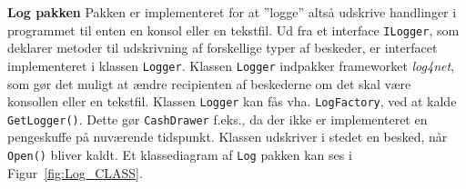 \textbf{Log pakken}
\newline
Pakken er implementeret for at ''logge'' altså udskrive handlinger i programmet til enten en konsol eller en tekstfil.
Ud fra et interface \texttt{ILogger}, som deklarer metoder til udskrivning af forskellige typer af beskeder, er interfacet implementeret i klassen \texttt{Logger}.
Klassen \texttt{Logger} indpakker frameworket \textit{log4net}, som gør det muligt at ændre recipienten af beskederne om det skal være konsollen eller en tekstfil. Klassen \texttt{Logger} kan fås vha. \texttt{LogFactory}, ved at kalde \texttt{GetLogger()}. Dette gør \texttt{CashDrawer} f.eks., da der ikke er implementeret en pengeskuffe på nuværende tidspunkt. Klassen udskriver i stedet en besked, når \texttt{Open()} bliver kaldt. Et klassediagram af \texttt{Log} pakken kan ses i Figur~\ref{fig:Log_CLASS}.

